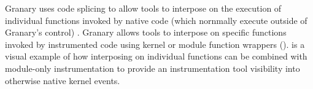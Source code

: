 \documentclass[preprint]{sigplanconf}
\begin{document}

Granary uses code splicing to allow tools to interpose on the execution of individual functions invoked by native code (which nornmally execute outside of Granary's control) \cite{KernInst,AnyWhereAnyTimeDBT,KProbes}. Granary allows tools to interpose on specific functions invoked by instrumented code using kernel or module function wrappers ().  is a visual example of how interposing on individual functions can be combined with module-only instrumentation to provide an instrumentation tool visibility into otherwise native kernel events.



\end{document}
